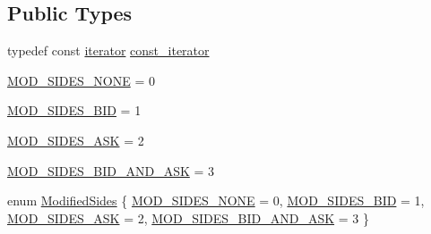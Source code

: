 \subsection*{Public Types}
\begin{CompactItemize}
\item 
typedef const \hyperlink{classWombat_1_1MamdaOrderBookBasicDeltaList_1_1iterator}{iterator} \hyperlink{classWombat_1_1MamdaOrderBookBasicDeltaList_e039c234de2127a8451a298849cc6c69}{const\_\-iterator}
\item 
\hyperlink{classWombat_1_1MamdaOrderBookBasicDeltaList_2edf0c7bea33ef46dc4071a9a4722ad16d6363be6425eded1a2d916e8d1ad3dc}{MOD\_\-SIDES\_\-NONE} = 0
\item 
\hyperlink{classWombat_1_1MamdaOrderBookBasicDeltaList_2edf0c7bea33ef46dc4071a9a4722ad10cbc320e60aceb516ab32b448c693610}{MOD\_\-SIDES\_\-BID} = 1
\item 
\hyperlink{classWombat_1_1MamdaOrderBookBasicDeltaList_2edf0c7bea33ef46dc4071a9a4722ad1217f81c7e1ca2fdbe72b766c06c94279}{MOD\_\-SIDES\_\-ASK} = 2
\item 
\hyperlink{classWombat_1_1MamdaOrderBookBasicDeltaList_2edf0c7bea33ef46dc4071a9a4722ad19e457d16a5dd14c49b6a46879e9d2024}{MOD\_\-SIDES\_\-BID\_\-AND\_\-ASK} = 3
\item 
enum \hyperlink{classWombat_1_1MamdaOrderBookBasicDeltaList_2edf0c7bea33ef46dc4071a9a4722ad1}{Modified\-Sides} \{ \hyperlink{classWombat_1_1MamdaOrderBookBasicDeltaList_2edf0c7bea33ef46dc4071a9a4722ad16d6363be6425eded1a2d916e8d1ad3dc}{MOD\_\-SIDES\_\-NONE} =  0, 
\hyperlink{classWombat_1_1MamdaOrderBookBasicDeltaList_2edf0c7bea33ef46dc4071a9a4722ad10cbc320e60aceb516ab32b448c693610}{MOD\_\-SIDES\_\-BID} =  1, 
\hyperlink{classWombat_1_1MamdaOrderBookBasicDeltaList_2edf0c7bea33ef46dc4071a9a4722ad1217f81c7e1ca2fdbe72b766c06c94279}{MOD\_\-SIDES\_\-ASK} =  2, 
\hyperlink{classWombat_1_1MamdaOrderBookBasicDeltaList_2edf0c7bea33ef46dc4071a9a4722ad19e457d16a5dd14c49b6a46879e9d2024}{MOD\_\-SIDES\_\-BID\_\-AND\_\-ASK} =  3
 \}
\end{CompactItemize}
